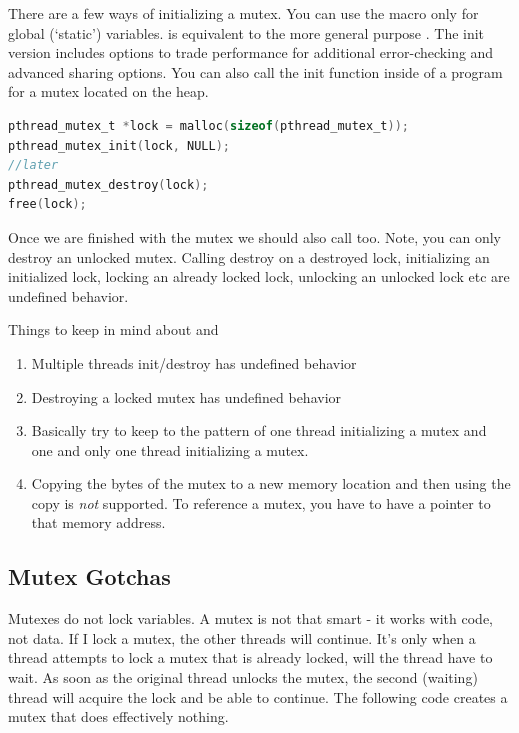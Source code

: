 There are a few ways of initializing a mutex. You can use the macro  only for global (`static') variables.  is equivalent to the more general purpose . The init version includes options to trade performance for additional error-checking and advanced sharing options. You can also call the init function inside of a program for a mutex located on the heap.

\begin{lstlisting}[language=C]
pthread_mutex_t *lock = malloc(sizeof(pthread_mutex_t)); 
pthread_mutex_init(lock, NULL);
//later
pthread_mutex_destroy(lock);
free(lock);
\end{lstlisting}

Once we are finished with the mutex we should also call  too. Note, you can only destroy an unlocked mutex. Calling destroy on a destroyed lock, initializing an initialized lock, locking an already locked lock, unlocking an unlocked lock etc are undefined behavior.

Things to keep in mind about  and 
\begin{enumerate} 
\item Multiple threads init/destroy has undefined behavior  
\item Destroying a locked mutex has undefined behavior  
\item Basically try to keep to the pattern of one thread initializing a mutex and one and only one thread initializing a mutex.
\item Copying the bytes of the mutex to a new memory location and then using the copy is \emph{not} supported. To reference a mutex, you have to have a pointer to that memory address.
\end{enumerate}

\subsection{Mutex Gotchas}

Mutexes do not lock variables. A mutex is not that smart - it works with code, not data. If I lock a mutex, the other threads will continue. It's only when a thread attempts to lock a mutex that is already locked, will the thread have to wait. As soon as the original thread unlocks the mutex, the second (waiting) thread will acquire the lock and be able to continue. The following code creates a mutex that does effectively nothing.

